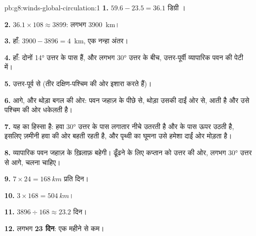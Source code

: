 \begin{solution}{pb:g8:winds-global-circulation:1}
\textbf{1.} $59.6 - 23.5 = 36.1$ डिग्री ।

\textbf{2.} $36.1 \times 108 \approx 3899$: लगभग \qty{3900}{km}।

\textbf{3.} हाँ: $3900 - 3896 = 4$~km, एक नन्हा अंतर।

\textbf{4.} हाँ: दोनों \ang{14} उत्तर के पास हैं,  और लगभग
\ang{30} उत्तर के बीच, उत्तर-पूर्वी व्यापारिक पवन की पेटी में।

\textbf{5.} उत्तर-पूर्व से (तीर दक्षिण-पश्चिम की ओर इशारा करते
हैं)।

\textbf{6.} आगे, और थोड़ा बगल की ओर: पवन जहाज़ के पीछे से, थोड़ा उसकी दाईं ओर से,
आती है और उसे पश्चिम की ओर धकेलती है।

\textbf{7.} यह  का हिस्सा है: हवा \ang{30} उत्तर के पास लगातार नीचे
उतरती है और  के पास ऊपर उठती है, इसलिए ज़मीनी हवा  की ओर बहती
रहती है, और पृथ्वी का घूमना उसे हमेशा दाईं ओर मोड़ता
है।

\textbf{8.} व्यापारिक पवन जहाज़ के ख़िलाफ़ बहेगी।  ढूँढने के लिए कप्तान को
उत्तर की ओर, लगभग \ang{30} उत्तर से आगे, चलना चाहिए।

\textbf{9.} $7 \times 24 = \qty{168}{km}$ प्रति दिन।

\textbf{10.} $3 \times 168 = \qty{504}{km}$।

\textbf{11.} $3896 \div 168 \approx 23.2$ दिन।

\textbf{12.} लगभग \textbf{23 दिन}: एक महीने से कम।
\end{solution}

